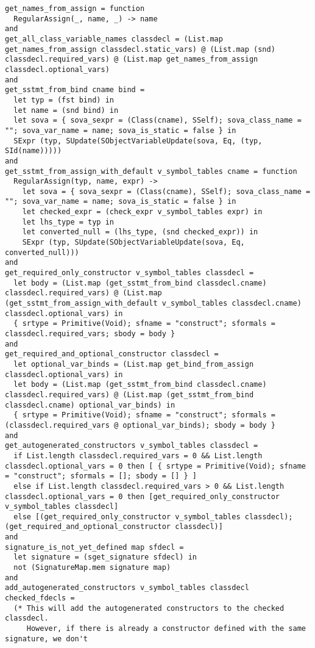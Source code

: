 \documentclass{article}
\begin{document}
\begin{verbatim}
get_names_from_assign = function
  RegularAssign(_, name, _) -> name
and
get_all_class_variable_names classdecl = (List.map get_names_from_assign classdecl.static_vars) @ (List.map (snd) classdecl.required_vars) @ (List.map get_names_from_assign classdecl.optional_vars)
and
get_sstmt_from_bind cname bind =
  let typ = (fst bind) in
  let name = (snd bind) in
  let sova = { sova_sexpr = (Class(cname), SSelf); sova_class_name = ""; sova_var_name = name; sova_is_static = false } in
  SExpr (typ, SUpdate(SObjectVariableUpdate(sova, Eq, (typ, SId(name)))))
and
get_sstmt_from_assign_with_default v_symbol_tables cname = function
  RegularAssign(typ, name, expr) ->
    let sova = { sova_sexpr = (Class(cname), SSelf); sova_class_name = ""; sova_var_name = name; sova_is_static = false } in
    let checked_expr = (check_expr v_symbol_tables expr) in
    let lhs_type = typ in
    let converted_null = (lhs_type, (snd checked_expr)) in
    SExpr (typ, SUpdate(SObjectVariableUpdate(sova, Eq, converted_null)))
and
get_required_only_constructor v_symbol_tables classdecl =
  let body = (List.map (get_sstmt_from_bind classdecl.cname) classdecl.required_vars) @ (List.map (get_sstmt_from_assign_with_default v_symbol_tables classdecl.cname) classdecl.optional_vars) in
  { srtype = Primitive(Void); sfname = "construct"; sformals = classdecl.required_vars; sbody = body }
and
get_required_and_optional_constructor classdecl =
  let optional_var_binds = (List.map get_bind_from_assign classdecl.optional_vars) in
  let body = (List.map (get_sstmt_from_bind classdecl.cname) classdecl.required_vars) @ (List.map (get_sstmt_from_bind classdecl.cname) optional_var_binds) in
  { srtype = Primitive(Void); sfname = "construct"; sformals = (classdecl.required_vars @ optional_var_binds); sbody = body }
and
get_autogenerated_constructors v_symbol_tables classdecl =
  if List.length classdecl.required_vars = 0 && List.length classdecl.optional_vars = 0 then [ { srtype = Primitive(Void); sfname = "construct"; sformals = []; sbody = [] } ]
  else if List.length classdecl.required_vars > 0 && List.length classdecl.optional_vars = 0 then [get_required_only_constructor v_symbol_tables classdecl]
  else [(get_required_only_constructor v_symbol_tables classdecl); (get_required_and_optional_constructor classdecl)]
and
signature_is_not_yet_defined map sfdecl =
  let signature = (sget_signature sfdecl) in
  not (SignatureMap.mem signature map)
and
add_autogenerated_constructors v_symbol_tables classdecl checked_fdecls =
  (* This will add the autogenerated constructors to the checked classdecl.
     However, if there is already a constructor defined with the same signature, we don't

\end{verbatim}
\end{document}
